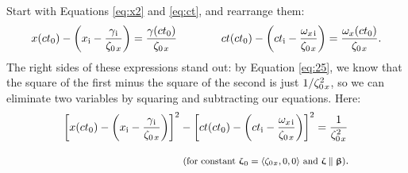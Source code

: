 \documentclass[12pt]{article}
\newcommand{\vvbeta}{\bm{\upbeta}}
\newcommand{\vvzeta}{\bm{\upzeta}}
\begin{document}
Start with Equations \ref{eq:x2} and \ref{eq:ct}, and rearrange them:
\begin{equation*}
x(ct_0) - \left( x_{\mathrm{i}} - \dfrac{\gamma_{\mkern1mu \mathrm{i}}}{ \zeta_{0 \mkern2mu x}} \right) = \dfrac{\gamma(ct_0) }{ \zeta_{0 \mkern2mu x}} \qquad \qquad  ct(ct_0) - \left( ct_{\mathrm{i}} - \dfrac{\omega_{x \mkern2mu \textrm{i} }}{ \zeta_{0 \mkern2mu x}} \right) = \dfrac{\omega_x (ct_0) }{ \zeta_{0 \mkern2mu x}} .
\end{equation*}
The right sides of these expressions stand out: by Equation \ref{eq:25}, we know that the square of the first minus the square of the second is just $1 / \zeta^2_{0 \mkern2mu x}$, so we can eliminate two variables by squaring and subtracting our equations. Here:
\begin{equation}\label{eq:hm}
\begin{aligned}
\left[ x(ct_0) - \left( x_{\mathrm{i}} - \dfrac{\gamma_{\mkern1mu \mathrm{i}}}{\zeta_{0 \mkern2mu x}} \right) \right] ^2 &- \left[ ct(ct_0) - \left( ct_{\mathrm{i}} - \dfrac{\omega_{x \mkern2mu \textrm{i} }}{ \zeta_{0 \mkern2mu x}} \right) \right] ^2 = \dfrac{1}{ \zeta^2_{0 \mkern2mu x}} \\[8pt]
& \textrm{\footnotesize{ (for constant $\vvzeta_{\mkern1mu 0} = \langle \zeta_{0 \mkern1mu x} , 0, 0 \rangle$ and $\vvzeta \parallel \vvbeta$)}}.
\end{aligned}
\end{equation}
\end{document}
